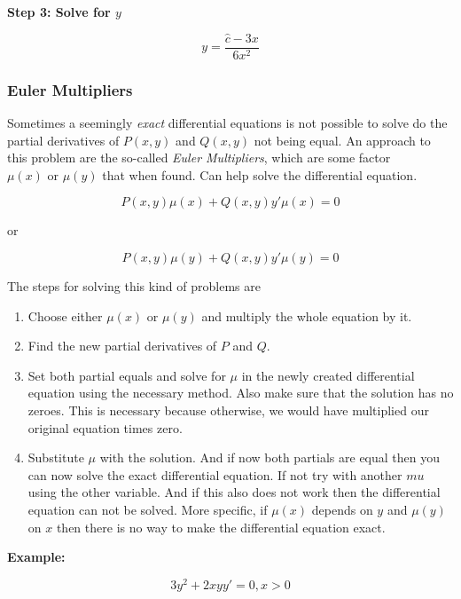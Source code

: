 \textbf{Step 3: Solve for \(y\)}

\[
    y = \frac{\hat{c} - 3x}{6x^2} 
\]

\subsubsection{Euler Multipliers}

Sometimes a seemingly \emph{exact} differential equations is not possible to solve do the partial 
derivatives of \(P(x,y)\) and \(Q(x,y)\) not being equal. An approach to this problem are the so-called 
\emph{Euler Multipliers}, which are some factor \(\mu(x) \text{ or } \mu(y)\) that when found. Can 
help solve the differential equation.

\[
    P(x,y)\mu(x) + Q(x,y)y'\mu(x) = 0
\]

or 

\[
    P(x,y)\mu(y) + Q(x,y)y'\mu(y) = 0
\]

The steps for solving this kind of problems are

\begin{enumerate}
    
    \item Choose either \(\mu(x)\) or \(\mu(y)\) and multiply the whole equation by it.
    
    \item Find the new partial derivatives of \(P\) and \(Q\).
    
    \item Set both partial equals and solve for \(\mu\) in the newly created differential equation 
          using the necessary method. Also make sure that the solution has no zeroes. This is necessary 
          because otherwise, we would have multiplied our original equation times zero.
    
    \item Substitute \(\mu\) with the solution. And if now both partials are equal then you can now 
          solve the exact differential equation. If not try with another \(mu\) using the other variable.
          And if this also does not work then the differential equation can not be solved. More specific, 
          if \(\mu(x)\) depends on \(y\) and \(\mu(y)\) on \(x\) then there is no way to make the 
          differential equation exact.

\end{enumerate}

\textbf{Example:}

\[
    3y^2 + 2xy y' = 0, x > 0 
\]

